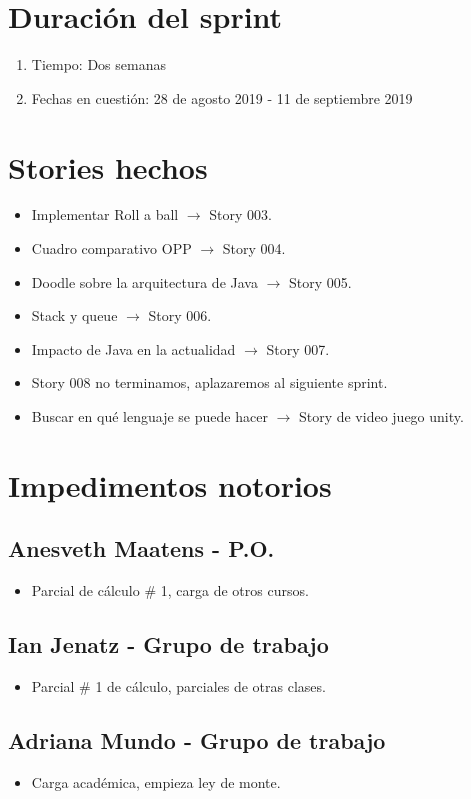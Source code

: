 \section{Duración del sprint}
\begin{enumerate}
    \item Tiempo: Dos semanas
    \item Fechas en cuestión: 28 de agosto 2019 - 11 de septiembre 2019
\end{enumerate}
\section{Stories hechos}
\begin{itemize}
    \item Implementar Roll a ball $\rightarrow$ Story 003.
    \item Cuadro comparativo OPP $\rightarrow$ Story 004.
    \item Doodle sobre la arquitectura de Java $\rightarrow$ Story 005.
    \item Stack y queue $\rightarrow$ Story 006.
    \item Impacto de Java en la actualidad $\rightarrow$ Story 007.
    \item Story 008 no terminamos, aplazaremos al siguiente sprint.
    \item Buscar en qué lenguaje se puede hacer $\rightarrow$ Story de video juego unity.
\end{itemize}

\section{Impedimentos notorios}

\subsection{Anesveth Maatens - P.O.}
\begin{itemize}
    \item Parcial de cálculo \# 1, carga de otros cursos.
\end{itemize}
\subsection{Ian Jenatz - Grupo de trabajo}
\begin{itemize}
    \item Parcial \# 1 de cálculo, parciales de otras clases.
\end{itemize}
\subsection{Adriana Mundo - Grupo de trabajo}
\begin{itemize}
    \item Carga académica, empieza ley de monte.
\end{itemize}


